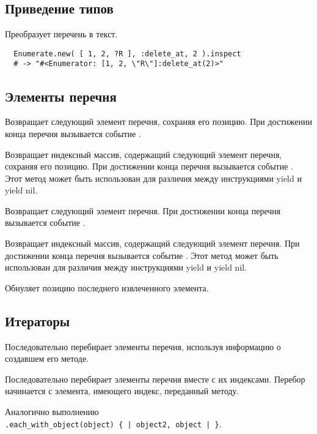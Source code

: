 \subsection*{Приведение типов}

\begin{methodlist}
  Преобразует перечень в текст. 
  \begin{verbatim}
  Enumerate.new( [ 1, 2, ?R ], :delete_at, 2 ).inspect 
  # -> "#<Enumerator: [1, 2, \"R\"]:delete_at(2)>"
  \end{verbatim}
\end{methodlist}

\subsection*{Элементы перечня}

\begin{methodlist}
  Возвращает следующий элемент перечня, сохраняя его позицию. При достижении конца перечня вызывается событие . 
 
  Возвращает индексный массив, содержащий следующий элемент перечня, сохраняя его позицию. При достижении конца перечня вызывается событие . Этот метод может быть использован для различия между инструкциями yield и yield nil. 
 
  Возвращает следующий элемент перечня. При достижении конца перечня вызывается событие . 
 
  Возвращает индексный массив, содержащий следующий элемент перечня. При достижении конца перечня вызывается событие . Этот метод может быть использован для различия между инструкциями yield и yield nil. 
 
  Обнуляет позицию последнего извлеченного элемента.
\end{methodlist}

\subsection*{Итераторы}

\begin{methodlist}
  Последовательно перебирает элементы перечня, используя информацию о создавшем его методе. 
 
  Последовательно перебирает элементы перечня вместе с их индексами. Перебор начинается с элемента, имеющего индекс, переданный методу.
 
  Аналогично выполнению 
  \\\verb!.each_with_object(object) { | object2, object | }!.
\end{methodlist}


